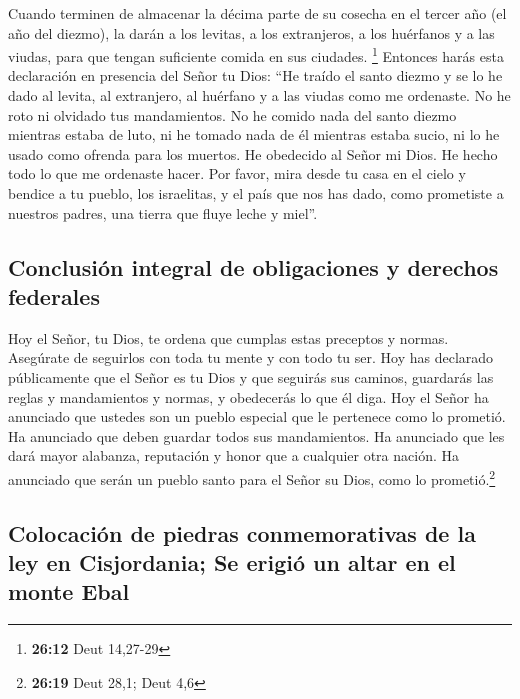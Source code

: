  Cuando terminen de almacenar la décima parte de su
cosecha en el tercer año (el año del diezmo), la darán a los levitas, a
los extranjeros, a los huérfanos y a las viudas, para que tengan
suficiente comida en sus ciudades. \footnote{\textbf{26:12} Deut
  14,27-29}  Entonces harás esta declaración en presencia
del Señor tu Dios: ``He traído el santo diezmo y se lo he dado al
levita, al extranjero, al huérfano y a las viudas como me ordenaste. No
he roto ni olvidado tus mandamientos.  No he comido nada
del santo diezmo mientras estaba de luto, ni he tomado nada de él
mientras estaba sucio, ni lo he usado como ofrenda para los muertos. He
obedecido al Señor mi Dios. He hecho todo lo que me ordenaste hacer.
 Por favor, mira desde tu casa en el cielo y bendice a tu
pueblo, los israelitas, y el país que nos has dado, como prometiste a
nuestros padres, una tierra que fluye leche y miel''.

\hypertarget{conclusiuxf3n-integral-de-obligaciones-y-derechos-federales}{%
\subsection{Conclusión integral de obligaciones y derechos
federales}\label{conclusiuxf3n-integral-de-obligaciones-y-derechos-federales}}

 Hoy el Señor, tu Dios, te ordena que cumplas estas
preceptos y normas. Asegúrate de seguirlos con toda tu mente y con todo
tu ser.  Hoy has declarado públicamente que el Señor es
tu Dios y que seguirás sus caminos, guardarás las reglas y mandamientos
y normas, y obedecerás lo que él diga.  Hoy el Señor ha
anunciado que ustedes son un pueblo especial que le pertenece como lo
prometió. Ha anunciado que deben guardar todos sus mandamientos.
 Ha anunciado que les dará mayor alabanza, reputación y
honor que a cualquier otra nación. Ha anunciado que serán un pueblo
santo para el Señor su Dios, como lo prometió.\footnote{\textbf{26:19}
  Deut 28,1; Deut 4,6}

\hypertarget{colocaciuxf3n-de-piedras-conmemorativas-de-la-ley-en-cisjordania-se-erigiuxf3-un-altar-en-el-monte-ebal}{%
\subsection{Colocación de piedras conmemorativas de la ley en
Cisjordania; Se erigió un altar en el monte
Ebal}\label{colocaciuxf3n-de-piedras-conmemorativas-de-la-ley-en-cisjordania-se-erigiuxf3-un-altar-en-el-monte-ebal}}

